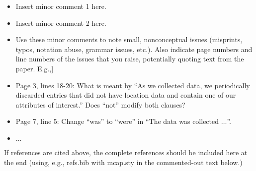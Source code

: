 \documentclass[11pt]{article}
\begin{document}
\begin{itemize}

\item Insert minor comment 1 here.

\item Insert minor comment 2 here. 

\item Use these minor comments to note small, nonconceptual issues (misprints, 
typos, notation abuse, grammar issues, etc.).  Also indicate page numbers 
and line numbers of the issues that you raise, potentially quoting text 
from the paper.  E.g.,] 

\item Page 3, lines 18-20: What is meant by ``As we collected data, we 
periodically discarded entries that did not have location data and contain
one of our attributes of interest.''  Does ``not''  modify both clauses?

\item Page 7, line 5: Change ``was'' to ``were'' in ``The data was collected 
$\ldots$''.

\item $\ldots$
\end{itemize}


If references are cited above, the complete references should be included here 
at the end (using, e.g., refs.bib with mcap.sty in the commented-out text 
below.)

%
% 
\end{document}
